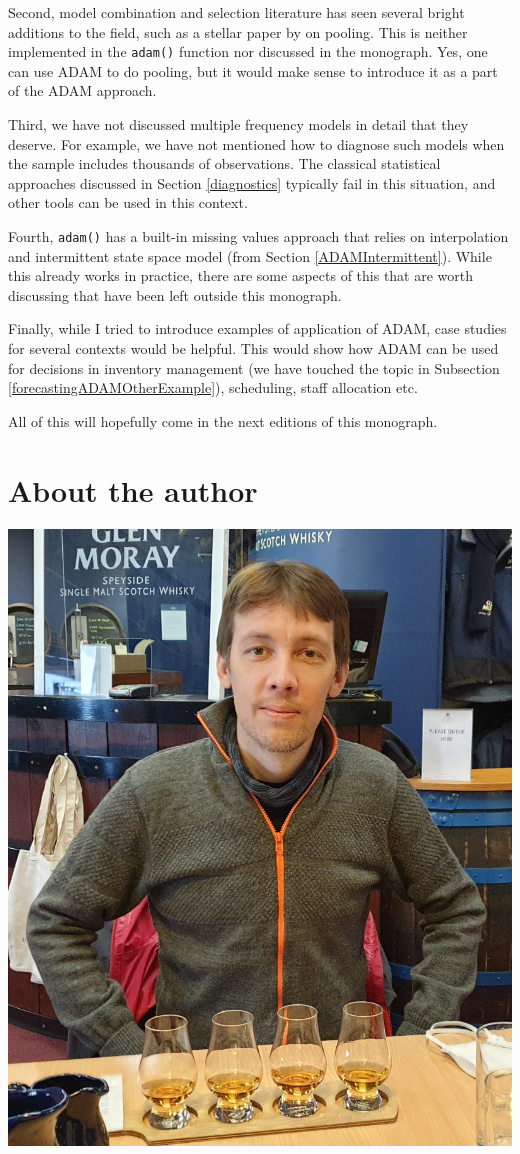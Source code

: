 \documentclass[
]{book}
\theoremstyle{definition}
\theoremstyle{definition}
\theoremstyle{definition}
\theoremstyle{definition}
\theoremstyle{remark}
\begin{document}
Second, model combination and selection literature has seen several bright additions to the field, such as a stellar paper by \citet{Kourentzes2019c} on pooling. This is neither implemented in the \texttt{adam()} function nor discussed in the monograph. Yes, one can use ADAM to do pooling, but it would make sense to introduce it as a part of the ADAM approach.

Third, we have not discussed multiple frequency models in detail that they deserve. For example, we have not mentioned how to diagnose such models when the sample includes thousands of observations. The classical statistical approaches discussed in Section \ref{diagnostics} typically fail in this situation, and other tools can be used in this context.

Fourth, \texttt{adam()} has a built-in missing values approach that relies on interpolation and intermittent state space model (from Section \ref{ADAMIntermittent}). While this already works in practice, there are some aspects of this that are worth discussing that have been left outside this monograph.

Finally, while I tried to introduce examples of application of ADAM, case studies for several contexts would be helpful. This would show how ADAM can be used for decisions in inventory management (we have touched the topic in Subsection \ref{forecastingADAMOtherExample}), scheduling, staff allocation etc.

All of this will hopefully come in the next editions of this monograph.

\hypertarget{about-the-author}{%
\chapter*{About the author}\label{about-the-author}}

\begin{center}\includegraphics[width=0.6\linewidth]{images/IvanSvetunkov-web} \end{center}
\end{document}
